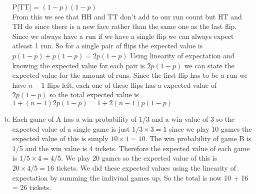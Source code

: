 \documentclass[11pt,letterpaper]{article}
\begin{document}
\begin{enumerate}[(a)]
P[TT] = $(1-p)(1-p)$\\
From this we see that HH and TT don't add to our run count but HT and TH do since there is a new face rather than the same one as the last flip.\\
Since we always have a run if we have a single flip we can always expect atleast 1 run. So for a single pair of flips the expected value is $p(1-p) + p(1-p) = 2p(1-p)$ Using linearity of expectation and knowing the expected value for each pair is $2p(1-p)$ we can state the expected value for the amount of runs. Since the first flip has to be a run we have $n-1$ flips left, each one of these flips has a expected value of $2p(1-p)$ so the total expected value is $1 + (n-1)2p(1-p) = 1+ 2(n-1)p(1-p)$
\item
Each game of A has a win probability of 1/3 and a win value of 3 so the expected value of a single game is just $1/3 \times 3 = 1$ since we play 10 games the expected value of this is simply $10\times 1 = 10$. The win probability of game B is 1/5 and the win value is 4 tickets. Therefore the expected value of each game is $1/5 \times 4 = 4/5$. We play 20 games so the expected value of this is $20 \times 4/5 = 16$ tickets. We did these expected values using the linearity of expectation by summing the indiviual games up. So the total is now 10 + 16 = 26 tickets.
\end{enumerate}
\end{document}

